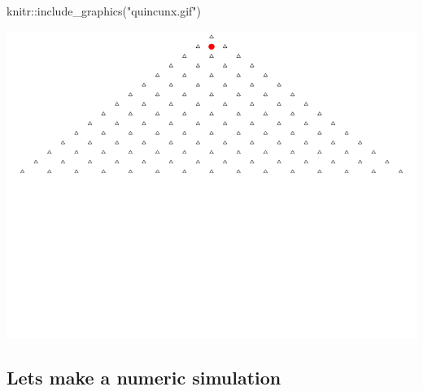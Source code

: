 \documentclass[
]{article}
\newenvironment{Shaded}{\begin{snugshade}}{\end{snugshade}}
\newcommand{\FunctionTok}[1]{\textcolor[rgb]{0.00,0.00,0.00}{#1}}
\newcommand{\NormalTok}[1]{#1}
\newcommand{\SpecialCharTok}[1]{\textcolor[rgb]{0.00,0.00,0.00}{#1}}
\newcommand{\StringTok}[1]{\textcolor[rgb]{0.31,0.60,0.02}{#1}}
\begin{document}
\begin{Shaded}
\begin{Highlighting}[]
\NormalTok{knitr}\SpecialCharTok{::}\FunctionTok{include\_graphics}\NormalTok{(}\StringTok{"quincunx.gif"}\NormalTok{)}
\end{Highlighting}
\end{Shaded}

\includegraphics{quincunx.gif}

\hypertarget{lets-make-a-numeric-simulation}{%
\subsection{Lets make a numeric
simulation}\label{lets-make-a-numeric-simulation}}
\end{document}
